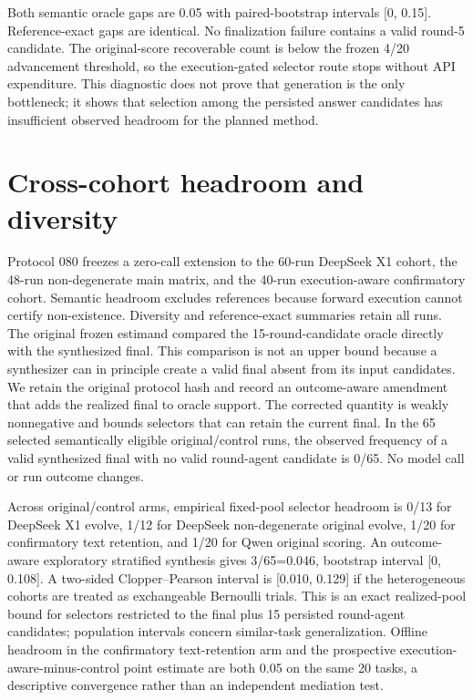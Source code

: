 Both semantic oracle gaps are 0.05 with paired-bootstrap intervals [0, 0.15]. Reference-exact gaps are identical. No finalization failure contains a valid round-5 candidate. The original-score recoverable count is below the frozen 4/20 advancement threshold, so the execution-gated selector route stops without API expenditure. This diagnostic does not prove that generation is the only bottleneck; it shows that selection among the persisted answer candidates has insufficient observed headroom for the planned method.

\section{Cross-cohort headroom and diversity}

Protocol 080 freezes a zero-call extension to the 60-run DeepSeek X1 cohort, the 48-run non-degenerate main matrix, and the 40-run execution-aware confirmatory cohort. Semantic headroom excludes \texttt{} references because forward execution cannot certify non-existence. Diversity and reference-exact summaries retain all runs. The original frozen estimand compared the 15-round-candidate oracle directly with the synthesized final. This comparison is not an upper bound because a synthesizer can in principle create a valid final absent from its input candidates. We retain the original protocol hash and record an outcome-aware amendment that adds the realized final to oracle support. The corrected quantity is weakly nonnegative and bounds selectors that can retain the current final. In the 65 selected semantically eligible original/control runs, the observed frequency of a valid synthesized final with no valid round-agent candidate is 0/65. No model call or run outcome changes.

Across original/control arms, empirical fixed-pool selector headroom is 0/13 for DeepSeek X1 evolve, 1/12 for DeepSeek non-degenerate original evolve, 1/20 for confirmatory text retention, and 1/20 for Qwen original scoring. An outcome-aware exploratory stratified synthesis gives 3/65=0.046, bootstrap interval [0, 0.108]. A two-sided Clopper--Pearson interval is [0.010, 0.129] if the heterogeneous cohorts are treated as exchangeable Bernoulli trials. This is an exact realized-pool bound for selectors restricted to the final plus 15 persisted round-agent candidates; population intervals concern similar-task generalization. Offline headroom in the confirmatory text-retention arm and the prospective execution-aware-minus-control point estimate are both 0.05 on the same 20 tasks, a descriptive convergence rather than an independent mediation test.

